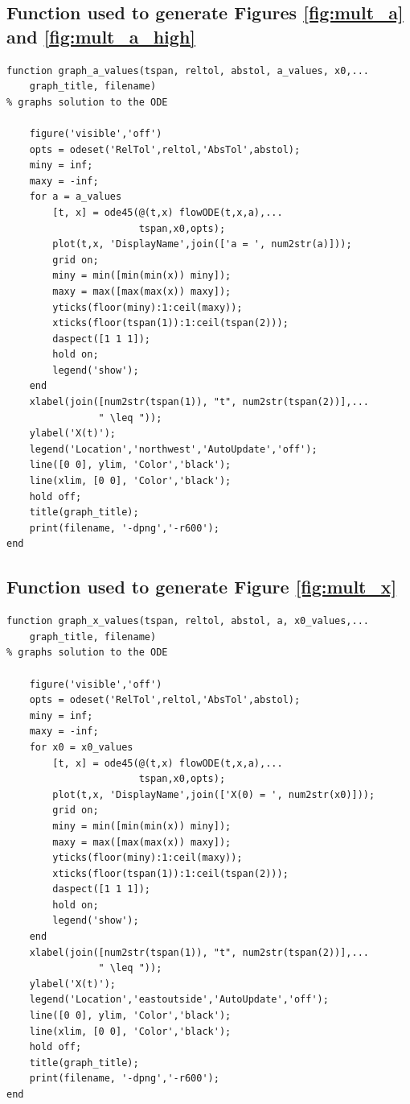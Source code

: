\documentclass[11pt]{article} %
\begin{document}
\subsection*{Function used to generate Figures \ref{fig:mult_a} and \ref{fig:mult_a_high}}
\begin{lstlisting}
function graph_a_values(tspan, reltol, abstol, a_values, x0,...
    graph_title, filename)
% graphs solution to the ODE

    figure('visible','off')
    opts = odeset('RelTol',reltol,'AbsTol',abstol);
    miny = inf;
    maxy = -inf;
    for a = a_values
        [t, x] = ode45(@(t,x) flowODE(t,x,a),...
                       tspan,x0,opts);
        plot(t,x, 'DisplayName',join(['a = ', num2str(a)]));
        grid on;
        miny = min([min(min(x)) miny]);
        maxy = max([max(max(x)) maxy]);
        yticks(floor(miny):1:ceil(maxy));
        xticks(floor(tspan(1)):1:ceil(tspan(2)));
        daspect([1 1 1]);
        hold on;
        legend('show');
    end
    xlabel(join([num2str(tspan(1)), "t", num2str(tspan(2))],...
                " \leq "));
    ylabel('X(t)');
    legend('Location','northwest','AutoUpdate','off');
    line([0 0], ylim, 'Color','black');
    line(xlim, [0 0], 'Color','black');
    hold off;
    title(graph_title);
    print(filename, '-dpng','-r600');
end
\end{lstlisting}
\subsection*{Function used to generate Figure \ref{fig:mult_x}}
\begin{lstlisting}
function graph_x_values(tspan, reltol, abstol, a, x0_values,...
    graph_title, filename)
% graphs solution to the ODE

    figure('visible','off')
    opts = odeset('RelTol',reltol,'AbsTol',abstol);
    miny = inf;
    maxy = -inf;
    for x0 = x0_values
        [t, x] = ode45(@(t,x) flowODE(t,x,a),...
                       tspan,x0,opts);
        plot(t,x, 'DisplayName',join(['X(0) = ', num2str(x0)]));
        grid on;
        miny = min([min(min(x)) miny]);
        maxy = max([max(max(x)) maxy]);
        yticks(floor(miny):1:ceil(maxy));
        xticks(floor(tspan(1)):1:ceil(tspan(2)));
        daspect([1 1 1]);
        hold on;
        legend('show');
    end
    xlabel(join([num2str(tspan(1)), "t", num2str(tspan(2))],...
                " \leq "));
    ylabel('X(t)');
    legend('Location','eastoutside','AutoUpdate','off');
    line([0 0], ylim, 'Color','black');
    line(xlim, [0 0], 'Color','black');
    hold off;
    title(graph_title);
    print(filename, '-dpng','-r600');
end
\end{lstlisting}
\end{document}
